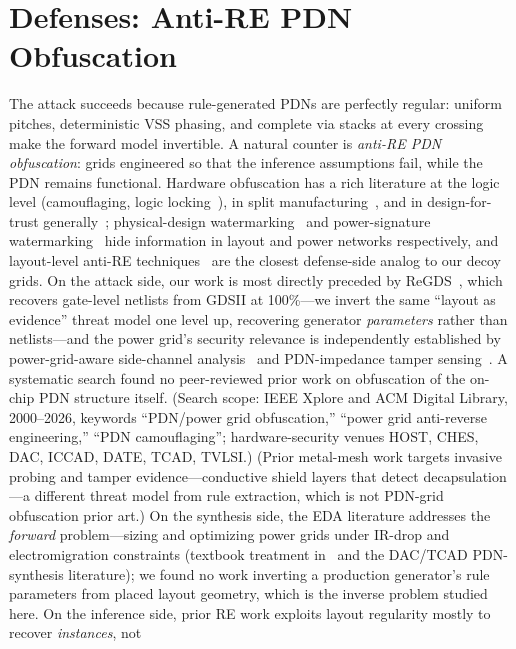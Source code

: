 \documentclass[11pt]{article}
\begin{document}
\section{Defenses: Anti-RE PDN Obfuscation}
\label{sec:defense}

The attack succeeds because rule-generated PDNs are perfectly regular:
uniform pitches, deterministic VSS phasing, and complete via stacks at
every crossing make the forward model invertible.  A natural counter is
\emph{anti-RE PDN obfuscation}: grids engineered so that the inference
assumptions fail, while the PDN remains functional.  Hardware obfuscation
has a rich literature at the logic level (camouflaging, logic
locking~\cite{shamsi2019,rajendran2012}), in split
manufacturing~\cite{perez2020,imeson2013}, and in design-for-trust
generally~\cite{rajendran2014}; physical-design
watermarking~\cite{kahng2001} and power-signature
watermarking~\cite{ziener2008} hide information in layout and power
networks respectively, and layout-level anti-RE
techniques~\cite{chen2015} are the closest defense-side analog to our
decoy grids.  On the attack side, our work is most directly preceded by
ReGDS~\cite{rajarathnam2020}, which recovers gate-level netlists from
GDSII at 100\%---we invert the same ``layout as evidence'' threat model
one level up, recovering generator \emph{parameters} rather than
netlists---and the power grid's security relevance is independently
established by power-grid-aware side-channel
analysis~\cite{wang2013} and PDN-impedance tamper
sensing~\cite{mosavirik2023}.  A systematic search found no peer-reviewed
prior work on obfuscation of the on-chip PDN structure itself.
(Search scope: IEEE Xplore and ACM Digital Library, 2000--2026,
keywords ``PDN/power grid obfuscation,'' ``power grid anti-reverse
engineering,'' ``PDN camouflaging''; hardware-security venues
HOST, CHES, DAC, ICCAD, DATE, TCAD, TVLSI.)
(Prior metal-mesh work targets invasive probing and tamper
evidence---conductive shield layers that detect decapsulation---a
different threat model from rule extraction, which is not PDN-grid
obfuscation prior art.)  On the synthesis side, the EDA
literature addresses the \emph{forward} problem---sizing and optimizing
power grids under IR-drop and electromigration constraints
(textbook treatment in~\cite{kahng2011vlsi} and the DAC/TCAD
PDN-synthesis literature); we found no work inverting a production
generator's rule parameters from placed layout geometry, which is the
inverse problem studied here.  On the inference side, prior RE work
exploits layout regularity mostly to recover \emph{instances}, not
\end{document}
